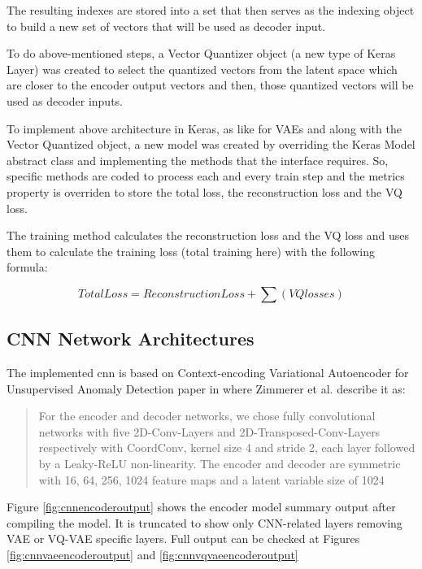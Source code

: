 The resulting indexes are stored into a set that then serves as the indexing object to build a new set of vectors that will be used as decoder input.

To do above-mentioned steps, a Vector Quantizer object (a new type of Keras Layer) was created to select the quantized vectors from the latent space which are closer to the encoder output vectors and then, those quantized vectors will be used as decoder inputs.

To implement above architecture in Keras, as like for VAEs and along with the Vector Quantized object, a new model was created by overriding the Keras Model abstract class and implementing the methods that the interface requires. So, specific methods are coded to process each and every train step and the metrics property is overriden to store the total loss, the reconstruction loss and the VQ loss.

The training method calculates the reconstruction loss and the VQ loss and uses them to calculate the training loss (total training here) with the following formula:

\begin{equation}
    Total Loss = Reconstruction Loss + \sum (VQ losses)
\end{equation}

\subsection{CNN Network Architectures}

The implemented \acrshort{cnn} is based on Context-encoding Variational Autoencoder for Unsupervised Anomaly Detection paper \cite{cevaemodel} in where Zimmerer et al. describe it as: 

\begin{quote}
    For the encoder and decoder networks, we chose fully convolutional networks with five 2D-Conv-Layers and 2D-Transposed-Conv-Layers respectively with CoordConv, kernel size 4 and stride 2, each layer followed by a Leaky-ReLU non-linearity. The encoder and decoder are symmetric with 16, 64, 256, 1024 feature maps and a latent variable size of 1024
\end{quote}

Figure \ref{fig:cnnencoderoutput} shows the encoder model summary output after compiling the model. It is truncated to show only CNN-related layers removing VAE or VQ-VAE specific layers. Full output can be checked at Figures \ref{fig:cnnvaeencoderoutput} and \ref{fig:cnnvqvaeencoderoutput}

